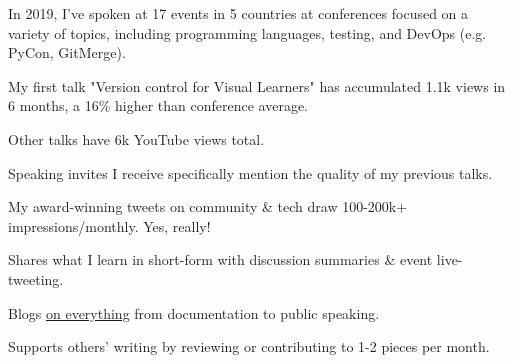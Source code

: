 \documentclass[letterpaper]{deedy-resume} %
\begin{document}
\begin{minipage}[t]{0.66\textwidth}

\vspace{\topsep} %
\begin{tightitemize}
\item In 2019, I've spoken at 17 events in 5 countries at conferences focused on a variety of topics, including programming languages, testing, and DevOps (e.g. PyCon, GitMerge).
\item My first talk "Version control for Visual Learners" has accumulated 1.1k views in 6 months, a 16\% higher than conference average.
\item Other talks have 6k YouTube views total.
\item Speaking invites I receive specifically mention the quality of my previous talks.
\end{tightitemize}

\sectionspace %


\begin{tightitemize}
\item My award-winning tweets on community \& tech draw 100-200k+ impressions/monthly. Yes, really!
\item Shares what I learn in short-form with discussion summaries \& event live-tweeting.
\end{tightitemize}

\sectionspace %


\begin{tightitemize}
\item Blogs \href{}{on everything} from documentation to public speaking.
\item Supports others' writing by reviewing or contributing to 1-2 pieces per month.
\end{tightitemize}

\sectionspace %
\vspace{-0.8\baselineskip}
%
%


\end{minipage}
\end{document}
